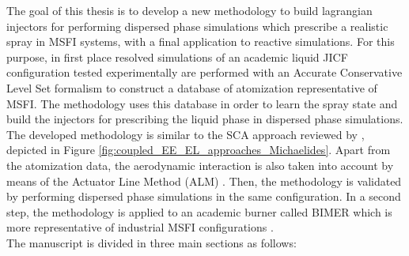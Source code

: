     
The goal of this thesis is to develop a new methodology to build lagrangian injectors for performing dispersed phase simulations which prescribe a realistic spray in MSFI systems, with a final application to reactive simulations. For this purpose, in first place resolved simulations of an academic liquid JICF configuration tested experimentally  are performed with an Accurate Conservative Level Set formalism  to construct a database of atomization representative of MSFI. The methodology uses this database in order to learn the spray state and build the injectors for prescribing the liquid phase in dispersed phase simulations. The developed methodology is similar to the SCA approach reviewed by , depicted in Figure \ref{fig:coupled_EE_EL_approaches_Michaelides}. Apart from the atomization data, the aerodynamic interaction is also taken into account by means of the Actuator Line Method (ALM) . Then, the methodology is validated by performing dispersed phase simulations in the same configuration. In a second step, the methodology is applied to an academic burner called BIMER which is more representative of industrial MSFI configurations . \\


The manuscript is divided in three main sections as follows:

